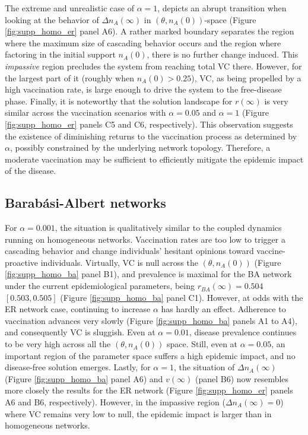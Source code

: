 \documentclass[
 reprint,
 amsmath,amssymb,
 aps,
]{revtex4-2}
\begin{document}
The extreme and unrealistic case of $\alpha=1$, depicts an abrupt transition when looking at the behavior of $\Delta n_A(\infty)$ in $(\theta, n_A(0))$-space (Figure \ref{fig:supp_homo_er} panel A6). A rather marked boundary separates the region where the maximum size of cascading behavior occurs and the region where factoring in the initial support $n_A(0)$, there is no further change induced. This \textit{impassive} region precludes the system from reaching total VC there. However, for the largest part of it (roughly when $n_A(0)>0.25$), VC, as being propelled by a high vaccination rate, is large enough to drive the system to the free-disease phase. Finally, it is noteworthy that the solution landscape for $r(\infty)$ is very similar across the vaccination scenarios with $\alpha=0.05$ and $\alpha=1$ (Figure \ref{fig:supp_homo_er} panels C5 and C6, respectively). This observation suggests the existence of diminishing returns to the vaccination process as determined by $\alpha$, possibly constrained by the underlying network topology. Therefore, a moderate vaccination may be sufficient to efficiently mitigate the epidemic impact of the disease. 

\subsection{Barabási-Albert networks}
\label{subapp:homogeneous_barabasialbert}

For $\alpha=0.001$, the situation is qualitatively similar to the coupled dynamics running on homogeneous networks. Vaccination rates are too low to trigger a cascading behavior and change individuals' hesitant opinions toward vaccine-proactive individuals. Virtually, VC is null across the $(\theta, n_A(0))$ (Figure \ref{fig:supp_homo_ba} panel B1), and prevalence is maximal for the BA network under the current epidemiological parameters, being $r_{BA}(\infty)=0.504$ $[0.503, 0.505]$ (Figure \ref{fig:supp_homo_ba} panel C1). However, at odds with the ER network case, continuing to increase $\alpha$ has hardly an effect. Adherence to vaccination advances very slowly (Figure \ref{fig:supp_homo_ba} panels A1 to A4), and consequently VC is sluggish. Even at $\alpha=0.01$, disease prevalence continues to be very high across all the $(\theta, n_A(0))$ space. Still, even at $\alpha=0.05$, an important region of the parameter space suffers a high epidemic impact, and no disease-free solution emerges. Lastly, for $\alpha=1$, the situation of $\Delta n_A(\infty)$ (Figure \ref{fig:supp_homo_ba} panel A6) and $v(\infty)$ (panel B6) now resembles more closely the results for the ER network (Figure \ref{fig:supp_homo_er} panels A6 and B6, respectively). However, in the impassive region ($\Delta n_A(\infty)=0$) where VC remains very low to null, the epidemic impact is larger than in homogeneous networks.
\end{document}
